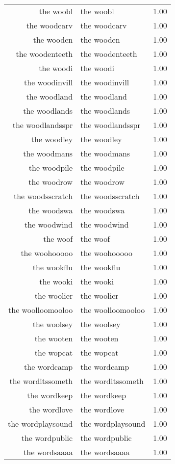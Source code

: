 \begin{table}[ht]
\begin{tabular}{rlr}
  the woobl & the woobl & 1.00 \\ 
  the woodcarv & the woodcarv & 1.00 \\ 
  the wooden & the wooden & 1.00 \\ 
  the woodenteeth & the woodenteeth & 1.00 \\ 
  the woodi & the woodi & 1.00 \\ 
  the woodinvill & the woodinvill & 1.00 \\ 
  the woodland & the woodland & 1.00 \\ 
  the woodlands & the woodlands & 1.00 \\ 
  the woodlandsspr & the woodlandsspr & 1.00 \\ 
  the woodley & the woodley & 1.00 \\ 
  the woodmans & the woodmans & 1.00 \\ 
  the woodpile & the woodpile & 1.00 \\ 
  the woodrow & the woodrow & 1.00 \\ 
  the woodsscratch & the woodsscratch & 1.00 \\ 
  the woodswa & the woodswa & 1.00 \\ 
  the woodwind & the woodwind & 1.00 \\ 
  the woof & the woof & 1.00 \\ 
  the woohooooo & the woohooooo & 1.00 \\ 
  the wookflu & the wookflu & 1.00 \\ 
  the wooki & the wooki & 1.00 \\ 
  the woolier & the woolier & 1.00 \\ 
  the woolloomooloo & the woolloomooloo & 1.00 \\ 
  the woolsey & the woolsey & 1.00 \\ 
  the wooten & the wooten & 1.00 \\ 
  the wopcat & the wopcat & 1.00 \\ 
  the wordcamp & the wordcamp & 1.00 \\ 
  the worditssometh & the worditssometh & 1.00 \\ 
  the wordkeep & the wordkeep & 1.00 \\ 
  the wordlove & the wordlove & 1.00 \\ 
  the wordplaysound & the wordplaysound & 1.00 \\ 
  the wordpublic & the wordpublic & 1.00 \\ 
  the wordsaaaa & the wordsaaaa & 1.00 \\ 

\end{tabular}
\end{table}

